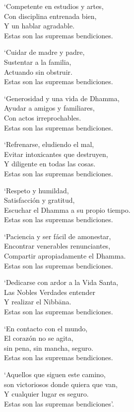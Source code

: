 \clearpage

`Competente en estudios y artes,\\
Con disciplina entrenada bien,\\
Y un hablar agradable.\\
Estas son las supremas bendiciones.

`Cuidar de madre y padre,\\
Sustentar a la familia,\\
Actuando sin obstruir.\\
Estas son las supremas bendiciones.

`Generosidad y una vida de Dhamma,\\
Ayudar a amigos y familiares,\\
Con actos irreprochables.\\
Estas son las supremas bendiciones.

`Refrenarse, eludiendo el mal,\\
Evitar intoxicantes que destruyen,\\
Y diligente en todas las cosas.\\
Estas son las supremas bendiciones.

`Respeto y humildad,\\
Satisfacción y gratitud,\\
Escuchar el Dhamma a su propio tiempo.\\
Estas son las supremas bendiciones.

`Paciencia y ser fácil de amonestar,\\
Encontrar venerables renunciantes,\\
Compartir apropiadamente el Dhamma.\\
Estas son las supremas bendiciones.

\clearpage

`Dedicarse con ardor a la Vida Santa,\\
Las Nobles Verdades entender\\
Y realizar el Nibbāna.\\
Estas son las supremas bendiciones.

`En contacto con el mundo,\\
El corazón no se agita,\\
sin pena, sin mancha, seguro.\\
Estas son las supremas bendiciones.

`Aquellos que siguen este camino,\\
son victoriosos donde quiera que van,\\
Y cualquier lugar es seguro.\\
Estas son las supremas bendiciones'.

